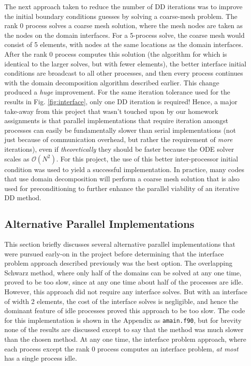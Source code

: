 \documentclass[10pt]{article}
\begin{document}
The next approach taken to reduce the number of DD iterations was to improve the initial boundary conditions guesses by solving a coarse-mesh problem. The rank 0 process solves a coarse mesh solution, where the mesh nodes are taken as the nodes on the domain interfaces. For a 5-process solve, the coarse mesh would consist of 5 elements, with nodes at the same locations as the domain interfaces. After the rank 0 process computes this solution (the algorithm for which is identical to the larger solves, but with fewer elements), the better interface initial conditions are broadcast to all other processes, and then every process continues with the domain decomposition algorithm described earlier. This change produced a {\it huge} improvement. For the same iteration tolerance used for the results in Fig. \ref{fig:interface}, only one DD iteration is required! Hence, a major take-away from this project that wasn't touched upon by our homework assignments is that parallel implementations that require iteration amongst processes can easily be fundamentally slower than serial implementations (not just because of communication overhead, but rather the requirement of {\it more} iterations), even if {\it theoretically} they should be faster because the ODE solver scales as \(\mathscr{O}(N^2)\). For this project, the use of this better inter-processor initial condition was used to yield a successful implementation. In practice, many codes that use domain decomposition will perform a coarse mesh solution that is also used for preconditioning to further enhance the parallel viability of an iterative DD method.

\subsection{Alternative Parallel Implementations}
This section briefly discusses several alternative parallel implementations that were pursued early-on in the project before determining that the interface problem approach described previously was the best option. The overlapping Schwarz method, where only half of the domains can be solved at any one time, proved to be too slow, since at any one time about half of the processes are idle. However, this approach did not require any interface solves. But with an interface of width 2 elements, the cost of the interface solves is negligible, and hence the dominant feature of idle processes proved this approach to be too slow. The code for this implementation is shown in the Appendix as {\tt amain.f90}, but for brevity none of the results are discussed except to say that the method was much slower than the chosen method. At any one time, the interface problem approach, where each process except the rank 0 process computes an interface problem, {\it at most} has a single process idle.
\end{document}
